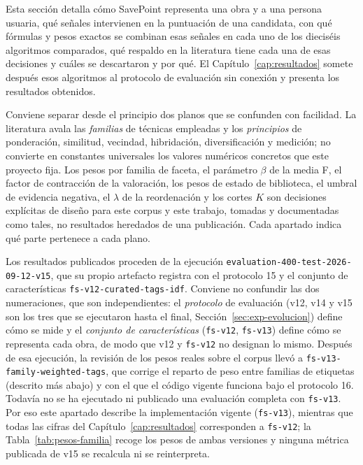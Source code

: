 Esta sección detalla cómo SavePoint representa una obra y a una persona usuaria, qué señales
intervienen en la puntuación de una candidata, con qué fórmulas y pesos exactos se combinan esas
señales en cada uno de los dieciséis algoritmos comparados, qué respaldo en la literatura tiene cada
una de esas decisiones y cuáles se descartaron y por qué. El Capítulo~\ref{cap:resultados}
somete después esos algoritmos al protocolo de evaluación sin conexión y presenta los resultados
obtenidos.

Conviene separar desde el principio dos planos que se confunden con facilidad. La literatura
avala las \emph{familias} de técnicas empleadas y los \emph{principios} de ponderación,
similitud, vecindad, hibridación, diversificación y medición; no convierte en constantes
universales los valores numéricos concretos que este proyecto fija. Los pesos por familia de
faceta, el parámetro \(\beta\) de la media F, el factor de contracción de la valoración, los pesos de
estado de biblioteca, el umbral de evidencia negativa, el \(\lambda\) de la reordenación y los
cortes \(K\) son decisiones explícitas de diseño para este corpus y este trabajo, tomadas y
documentadas como tales, no resultados heredados de una publicación. Cada apartado indica qué
parte pertenece a cada plano.

Los resultados publicados proceden de la ejecución \texttt{evaluation-400-test-2026-09-12-v15},
que su propio artefacto registra con el protocolo 15 y el conjunto de características
\texttt{fs-v12-curated-tags-idf}. Conviene no confundir las dos numeraciones, que son
independientes: el \emph{protocolo} de evaluación (v12, v14 y v15 son los tres que se ejecutaron
hasta el final, Sección~\ref{sec:exp-evolucion}) define cómo se mide y el \emph{conjunto de
características} (\texttt{fs-v12}, \texttt{fs-v13}) define cómo se representa cada obra, de modo
que v12 y \texttt{fs-v12} no designan lo mismo. Después de esa ejecución, la revisión de los pesos
reales sobre el corpus llevó a \texttt{fs-v13-family-weighted-tags}, que corrige el reparto de
peso entre familias de etiquetas (descrito más abajo) y con el que el código vigente funciona
bajo el protocolo 16. Todavía no se ha ejecutado ni publicado una evaluación completa con
\texttt{fs-v13}. Por eso este apartado describe la implementación vigente (\texttt{fs-v13}),
mientras que todas las cifras del Capítulo~\ref{cap:resultados} corresponden a \texttt{fs-v12};
la Tabla~\ref{tab:pesos-familia} recoge los pesos de ambas versiones y ninguna métrica
publicada de v15 se recalcula ni se reinterpreta.

